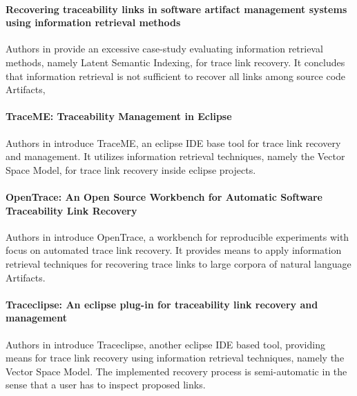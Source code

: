 \paragraph*{Recovering traceability links in software artifact management systems using information retrieval methods}
Authors in \cite{DBLP:journals/tosem/LuciaFOT07}
provide an excessive case-study evaluating information retrieval methods, namely Latent Semantic Indexing, for trace link recovery.
It concludes that information retrieval is not sufficient to recover all links among source code \glspl{Artifact}, 

\paragraph*{TraceME: Traceability Management in Eclipse}
Authors in \cite{DBLP:conf/icsm/BavotaCLFOP12}
introduce TraceME, an eclipse \gls{IDE} base tool for trace link recovery and management.
It utilizes information retrieval techniques, namely the Vector Space Model, for trace link recovery inside eclipse projects.

\paragraph*{OpenTrace: An Open Source Workbench for Automatic Software Traceability Link Recovery}
Authors in \cite{DBLP:conf/wcre/AngiusW12}
introduce OpenTrace, a workbench for reproducible experiments with focus on automated trace link recovery.
It provides means to apply information retrieval techniques for recovering trace links to large corpora of natural language \glspl{Artifact}.

\paragraph*{Traceclipse: An eclipse plug-in for traceability link recovery and management}
Authors in \cite{DBLP:conf/icse/KlockGDP11}
introduce Traceclipse, another eclipse \gls{IDE} based tool, providing means for trace link recovery using information retrieval techniques, namely the Vector Space Model.
The implemented recovery process is semi-automatic in the sense that a user has to inspect proposed links.

